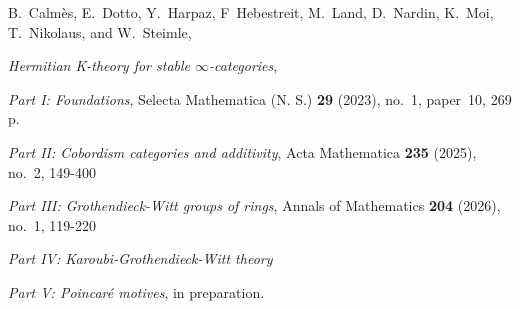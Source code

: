 {\footnotesize%
\noindent B.~Calmès, E.~Dotto, Y.~Harpaz, F~Hebestreit, M.~Land, D.~Nardin, K.~Moi, T.~Nikolaus, and W.~Steimle,

\noindent\textit{Hermitian K-theory for stable $\infty$-categories},
}

\begin{biblist}
\textit{Part I: Foundations},
Selecta Mathematica (N. S.)
{\bf 29} (2023), no.~1, paper~10, 269 p.

\textit{Part II: Cobordism categories and additivity},
Acta Mathematica
{\bf 235} (2025), no.~2, 149-400

\textit{Part III: Grothendieck-Witt groups of rings},
Annals of Mathematics
{\bf 204} (2026), no.~1, 119-220

\textit{Part IV: Karoubi-Grothendieck-Witt theory}

\textit{Part V: Poincaré motives},
in preparation.


\end{biblist}

